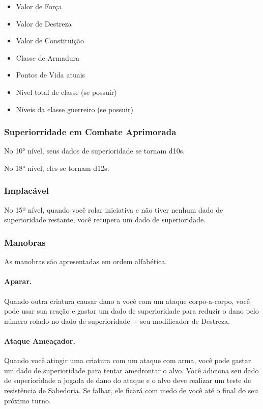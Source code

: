 \documentclass{RPG_Adventure}[2021/10/20]
\begin{document}
\begin{itemize}
    \item Valor de Força
    \item Valor de Destreza
    \item Valor de Constituição
    \item Classe de Armadura
    \item Pontos de Vida atuais
    \item Nível total de classe (se possuir)
    \item Níveis da classe guerreiro (se possuir)
\end{itemize}

\subsubsection{Superiorridade em Combate Aprimorada}%
\label{ssub:superiorridade_em_combate_aprimorada}

No 10° nível, seus dados de superioridade se tornam d10s.

No 18° nível, eles se tornam d12s.

\subsubsection{Implacável}%
\label{ssub:implacavel}

No 15º nível, quando você rolar iniciativa e não tiver nenhum dado de
superioridade restante, você recupera um dado de superioridade.

\subsubsection{Manobras}%
\label{ssub:manobras}

As manobras são apresentadas em ordem alfabética.

\paragraph{Aparar.} Quando outra criatura causar dano a você com um ataque
corpo-a-corpo, você pode usar sua reação e gastar um dado de superioridade para
reduzir o dano pelo número rolado no dado de superioridade + seu modificador de
Destreza.

\paragraph{Ataque Ameaçador.} Quando você atingir uma criatura com um ataque com
arma, você pode gastar um dado de superioridade para tentar amedrontar o alvo.
Você adiciona seu dado de superioridade a jogada de dano do ataque e o alvo deve
realizar um teste de resistência de Sabedoria. Se falhar, ele ficará com medo de
você até o final do seu próximo turno.
\end{document}

